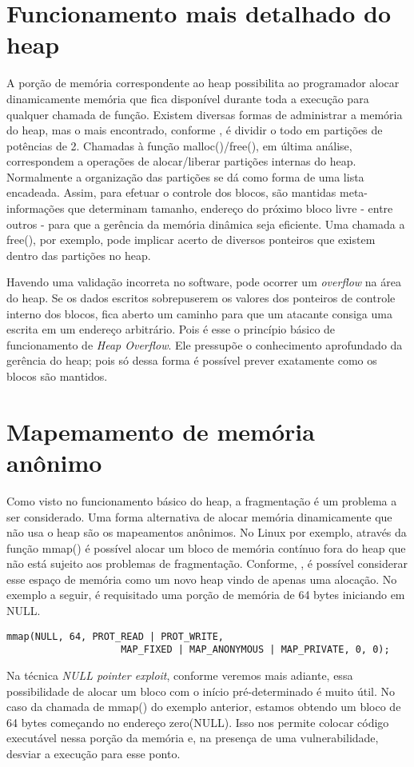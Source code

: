 	\section{Funcionamento mais detalhado do heap}
	\label{sec:funcionamento_heap}
	A porção de memória correspondente ao heap possibilita ao programador alocar dinamicamente memória
	que fica disponível durante toda a execução para qualquer chamada de função.
	Existem diversas formas de administrar a memória do heap, mas o mais encontrado, conforme
	\cite{Love2007}, é dividir o todo em partições de potências de 2. Chamadas à função malloc()/free(),
	em última análise, correspondem a operações de alocar/liberar partições internas do heap.
	Normalmente a organização das partições se dá como forma de uma lista encadeada.
	Assim, para efetuar o controle dos blocos, são mantidas meta-informações que determinam
	tamanho, endereço do próximo bloco livre - entre outros - para que a gerência
	da memória dinâmica seja eficiente.
	Uma chamada a free(), por exemplo, pode implicar acerto de diversos ponteiros que existem
	dentro das partições no heap.
	 

	Havendo uma validação incorreta no software, pode ocorrer um \textsl{overflow} na área do
	heap. Se os dados escritos sobrepuserem os valores dos ponteiros de controle interno dos blocos,
	fica aberto um caminho para que um atacante consiga uma escrita em um endereço arbitrário.
	Pois é esse o princípio básico de funcionamento de \textsl{Heap Overflow}. Ele pressupõe
	o conhecimento aprofundado da gerência do heap; pois só dessa forma é possível prever
	exatamente como os blocos são mantidos.

	\section{Mapemamento de memória anônimo}
	Como visto no funcionamento básico do heap, a fragmentação é um problema a ser considerado.
	Uma forma alternativa de alocar memória dinamicamente que não usa o heap são os mapeamentos anônimos.
	No Linux por exemplo, através da função mmap() é possível alocar um bloco de memória contínuo
	fora do heap que não está sujeito aos problemas de fragmentação.
	Conforme, \cite{Love2007}, é possível considerar esse espaço de memória como um novo heap
	vindo de apenas uma alocação.
	No exemplo a seguir, é requisitado uma porção de memória de 64 bytes iniciando em NULL.
	\begin{lstlisting}[label=mmap_example,caption=Mapeamento de memória anônimo.]
		mmap(NULL, 64, PROT_READ | PROT_WRITE, 
					MAP_FIXED | MAP_ANONYMOUS | MAP_PRIVATE, 0, 0);
	\end{lstlisting}
	Na técnica \textsl{NULL pointer exploit}, conforme veremos mais adiante, essa possibilidade
	de alocar um bloco com o início pré-determinado é muito útil.
	No caso da chamada de mmap() do exemplo anterior, estamos obtendo um bloco de 64 bytes começando
	no endereço zero(NULL). Isso nos permite colocar código executável nessa porção da memória e,
	na presença de uma vulnerabilidade, desviar a execução para esse ponto.
	
